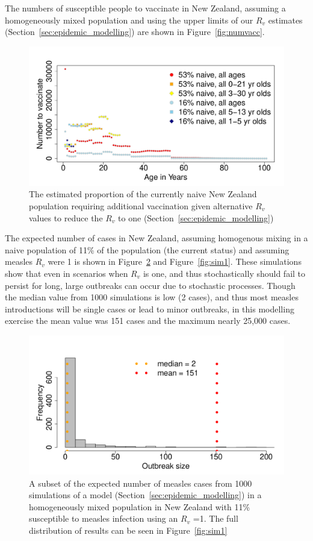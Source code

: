 \documentclass{article}
\begin{document}
The numbers of susceptible people to vaccinate in New Zealand, assuming a homogeneously mixed population and using the upper limits of our $R_v$ estimates (Section~\ref{sec:epidemic_modelling}) are shown in Figure~\ref{fig:numvacc}.


\begin{figure}
     \centering
\includegraphics{interimreport2-034}
     \caption{The estimated proportion of the currently naive New Zealand population requiring additional vaccination given alternative $R_v$ values to reduce the $R_v$ to one (Section~\ref{sec:epidemic_modelling})}
     \label{fig:numvac}
\end{figure}

The expected number of cases in New Zealand, assuming homogenous mixing in a naive population of 11\% of the population (the current status) and assuming measles $R_v$ were 1 is shown in Figure~\ref{fig:sim} and Figure~\ref{fig:sim1}. These simulations show that even in scenarios when $R_v$ is one, and thus stochastically should fail to persist for long, large outbreaks can occur due to stochastic processes. Though the median value from 1000 simulations is low (2 cases), and thus most measles introductions will be single cases or lead to minor outbreaks, in this modelling exercise the mean value was 151 cases and the maximum nearly 25,000 cases.


\begin{figure}
     \centering
\includegraphics{interimreport2-036}
     \caption{A subset of the expected number of measles cases from 1000 simulations of a model (Section~\ref{sec:epidemic_modelling}) in a homogeneously mixed population in New Zealand with 11\% susceptible to measles infection using an $R_v$ =1. The full distribution of results can be seen in Figure~\ref{fig:sim1}}
     \label{fig:sim}
\end{figure}
\end{document}
